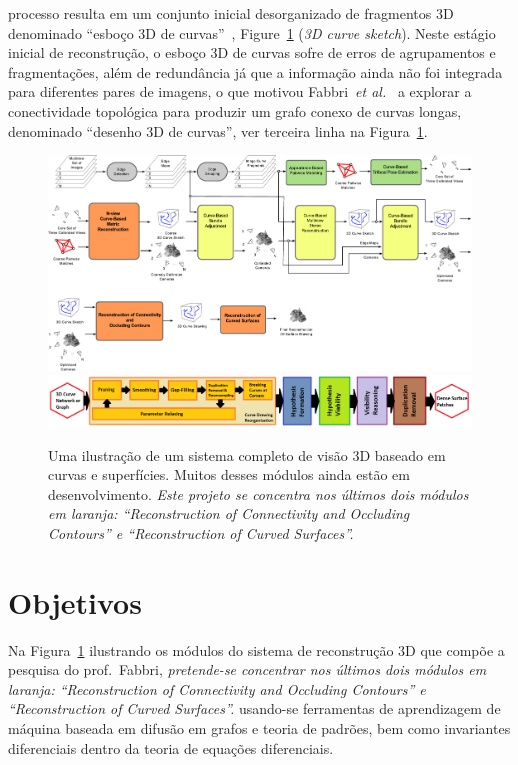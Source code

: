 \documentclass[a4paper,titlepage]{article}
\newcommand{\etal}{{\it et al.}}
\begin{document}
processo resulta em um conjunto inicial desorganizado de fragmentos 3D
denominado ``esboço 3D de
curvas''~\cite{fabbri2011multiview,fabbri2016multiview},
Figure~\ref{fig:lofting:pipeline} (\emph{3D curve sketch}). Neste estágio
inicial de reconstrução, o esboço 3D de curvas sofre de erros de agrupamentos e
fragmentações, além de redundância já que a informação ainda não foi integrada
para diferentes pares de imagens, o que motivou Fabbri~\etal~\cite{usumezbas2016multiview}
a explorar a conectividade topológica  para produzir um grafo conexo de
curvas longas, denominado ``desenho 3D de curvas'', ver terceira linha na
Figura~\ref{fig:lofting:pipeline}.
\begin{figure}
  \begin{center}
    \includegraphics[width=\linewidth]{figs/mega-system-drawing-pt.pdf}
    \includegraphics[width=\linewidth]{figs/lofting-pipeline.png}
  \end{center}
  \caption{Uma ilustração de um sistema completo de visão 3D baseado em curvas e
  superfícies. Muitos desses módulos ainda estão em desenvolvimento. \emph{Este
projeto se concentra nos últimos dois módulos em laranja: ``Reconstruction of
Connectivity and Occluding Contours'' e ``Reconstruction of Curved Surfaces''.}}
  \label{fig:lofting:pipeline}
\end{figure}


\section{Objetivos}

Na Figura~\ref{fig:lofting:pipeline} ilustrando os módulos do sistema de
reconstrução 3D que compõe a pesquisa do prof.\ Fabbri, \emph{pretende-se concentrar
nos últimos dois módulos em laranja: ``Reconstruction of Connectivity and
Occluding Contours'' e ``Reconstruction of Curved Surfaces''.}
usando-se ferramentas de aprendizagem de máquina baseada em
difusão em grafos e teoria de padrões, bem como invariantes diferenciais dentro
da teoria de equações diferenciais.
\end{document}
